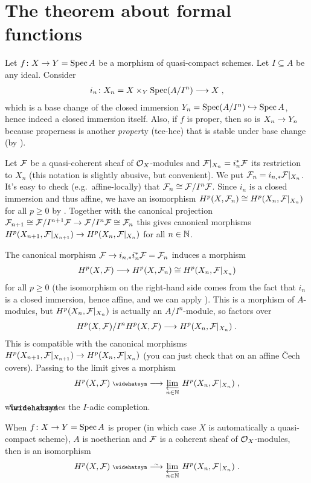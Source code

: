 \documentclass[a4paper,parskip=half,numbers=enddot, DIV=12]{scrreprt}
\renewcommand{\geq}{\geqslant}
\begin{document}
\section{The theorem about formal functions}
Let $f\colon X\morphism Y=\Spec A$ be a  morphism of quasi-compact schemes. Let $I\subseteq A$ be any ideal. Consider
\begin{align*}
	i_n\colon X_n=X\times_Y\Spec (A/I^n)\morphism X\;,
\end{align*}
which is a base change of the closed immersion $Y_n=\Spec (A/I^n)\monomorphism \Spec A$, hence indeed a closed immersion itself. Also, if $f$ is proper, then so is $X_n\morphism Y_n$ because properness is another \emph{proper}ty (tee-hee) that is stable under base change (by \cite[Remark~2.4.1]{alggeo2}).

Let $\mathcal{F}$ be a quasi-coherent sheaf of $\mathcal{O}_X$-modules and $\mathcal{F}|_{X_n}=i_n ^*\mathcal{F}$ its restriction to $X_n$ (this notation is slightly abusive, but convenient). We put $\mathcal{F}_n=i_{n,*}\mathcal{F}|_{X_n}$. It's easy to check (e.g.\ affine-locally) that $\mathcal{F}_n\cong \mathcal{F}/I^n\mathcal{F}$. Since $i_n$ is a closed immersion and thus affine, we have an isomorphism $H^p(X,\mathcal{F}_n)\cong H^p(X_n,\mathcal{F}|_{X_n})$ for all $p\geq 0$ by \cite[Corollary~1.5.1]{alggeo2}. Together with the canonical projection $\Ff_{n+1}\cong \Ff/I^{n+1}\Ff\morphism \Ff/I^n\Ff\cong \Ff_n$ this gives canonical morphisms $H^p(X_{n+1},\Ff|_{X_{n+1}})\morphism H^p(X_n,\Ff|_{X_n})$ for all $n\in\mathbb{N}$.

The canonical morphism $\Ff\morphism i_{n,*}i_n^*\Ff=\Ff_n$ induces a morphism
\begin{align}\lbl{eq:Hmorphism}
	H^p(X,\Ff)\morphism H^p(X,\Ff_n)\cong H^p(X_n,\Ff|_{X_n})
\end{align}
for all $p\geq 0$ (the isomorphism on the right-hand side comes from the fact that $i_n$ is a closed immersion, hence affine, and we can apply \cite[Corollary~1.6.1]{alggeo2}). This is a morphism of $A$-modules, but $H^p(X_n,\mathcal{F}|_{X_n})$ is actually an $A/I^n$-module, so  factors over
\begin{align*}
	H^p(X,\Ff)/I^nH^p(X,\Ff)\morphism H^p(X_n,\Ff|_{X_n})\;.
\end{align*}
This is compatible with the canonical morphisms $H^p(X_{n+1},\Ff|_{X_{n+1}})\morphism H^p(X_n,\Ff|_{X_n})$ (you can just check that on an affine \v Cech covers). Passing to the limit gives a morphism
\begin{align}\lbl{eq:formalFunctions}
	H^p(X,\Ff)^\complete\morphism\limit[n\in\IN]H^p(X_n,\Ff|_{X_n})\;,
\end{align}
where $\roof{\phantom{x}}$ denotes the $I$-adic completion.
\begin{thm}
	When $f\colon X\morphism Y=\Spec A$ is proper (in which case $X$ is automatically a quasi-compact scheme), $A$ is noetherian and $\mathcal{F}$ is a coherent sheaf of $\mathcal{O}_X$-modules, then  is an isomorphism
	\begin{align*}
		H^p(X,\Ff)^\complete\isomorphism \limit[n\in\IN]H^p(X_n,\Ff|_{X_n})\;.
	\end{align*}
\end{thm}
\end{document}

